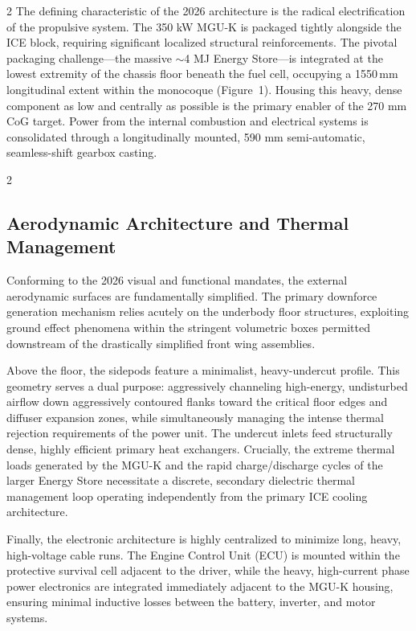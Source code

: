 \begin{multicols}{2}
The defining characteristic of the 2026 architecture is the radical electrification of the propulsive system. The 350 kW MGU-K is packaged tightly alongside the ICE block, requiring significant localized structural reinforcements. The pivotal packaging challenge---the massive $\sim$4 MJ Energy Store---is integrated at the lowest extremity of the chassis floor beneath the fuel cell, occupying a 1550\,mm longitudinal extent within the monocoque (Figure~1). Housing this heavy, dense component as low and centrally as possible is the primary enabler of the 270 mm CoG target. Power from the internal combustion and electrical systems is consolidated through a longitudinally mounted, 590 mm semi-automatic, seamless-shift gearbox casting.
\end{multicols}

\begin{multicols}{2}
\subsection{Aerodynamic Architecture and Thermal Management}

Conforming to the 2026 visual and functional mandates, the external aerodynamic surfaces are fundamentally simplified. The primary downforce generation mechanism relies acutely on the underbody floor structures, exploiting ground effect phenomena within the stringent volumetric boxes permitted downstream of the drastically simplified front wing assemblies. 

Above the floor, the sidepods feature a minimalist, heavy-undercut profile. This geometry serves a dual purpose: aggressively channeling high-energy, undisturbed airflow down aggressively contoured flanks toward the critical floor edges and diffuser expansion zones, while simultaneously managing the intense thermal rejection requirements of the power unit. The undercut inlets feed structurally dense, highly efficient primary heat exchangers. Crucially, the extreme thermal loads generated by the MGU-K and the rapid charge/discharge cycles of the larger Energy Store necessitate a discrete, secondary dielectric thermal management loop operating independently from the primary ICE cooling architecture. 

Finally, the electronic architecture is highly centralized to minimize long, heavy, high-voltage cable runs. The Engine Control Unit (ECU) is mounted within the protective survival cell adjacent to the driver, while the heavy, high-current phase power electronics are integrated immediately adjacent to the MGU-K housing, ensuring minimal inductive losses between the battery, inverter, and motor systems.
\end{multicols}
